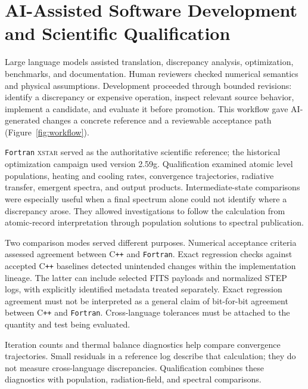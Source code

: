 \documentclass[11pt,twoside]{article}
\begin{document}
\section{AI-Assisted Software Development and Scientific Qualification}
Large language models assisted translation, discrepancy analysis, optimization, benchmarks, and documentation. Human reviewers checked numerical semantics and physical assumptions. Development proceeded through bounded revisions: identify a discrepancy or expensive operation, inspect relevant source behavior, implement a candidate, and evaluate it before promotion. This workflow gave AI-generated changes a concrete reference and a reviewable acceptance path (Figure~\ref{fig:workflow}).


\texttt{Fortran} \textsc{xstar} served as the authoritative scientific reference; the historical optimization campaign used version 2.59g. 
Qualification examined atomic level populations, heating and cooling rates, convergence trajectories, radiative transfer, emergent spectra, and output products. Intermediate-state comparisons were especially useful when a final spectrum alone could not identify where a discrepancy arose. They allowed investigations to follow the calculation from atomic-record interpretation through population solutions to spectral publication.

Two comparison modes served different purposes. Numerical acceptance criteria assessed agreement between C{}\texttt{++} and \texttt{Fortran}. Exact regression checks against accepted C{}\texttt{++} baselines detected unintended changes within the implementation lineage. The latter can include selected FITS payloads and normalized STEP logs, with explicitly identified metadata treated separately. Exact regression agreement must not be interpreted as a general claim of bit-for-bit agreement between C{}\texttt{++} and \texttt{Fortran}. Cross-language tolerances must be attached to the quantity and test being evaluated.

Iteration counts and thermal balance diagnostics help compare convergence trajectories. Small residuals in a reference log describe that calculation; they do not measure cross-language discrepancies. Qualification combines these diagnostics with population, radiation-field, and spectral comparisons.
\end{document}
